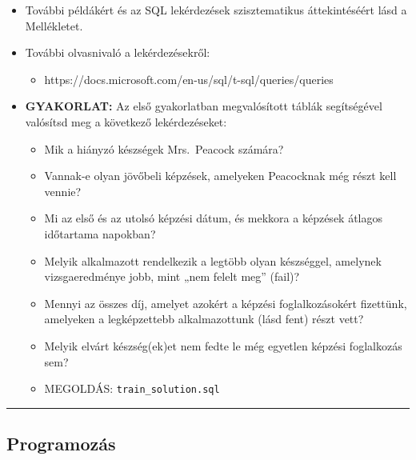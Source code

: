 \documentclass[
  magyar,
]{article}
\providecommand{\tightlist}{%
  \setlength{\itemsep}{0pt}\setlength{\parskip}{0pt}}
\begin{document}
\begin{itemize}
\item
  További példákért és az SQL lekérdezések szisztematikus áttekintéséért
  lásd a Mellékletet.
\item
  További olvasnivaló a lekérdezésekről:

  \begin{itemize}
  \tightlist
  \item
    https://docs.microsoft.com/en-us/sql/t-sql/queries/queries
  \end{itemize}
\item
  \textbf{GYAKORLAT:} Az első gyakorlatban megvalósított táblák
  segítségével valósítsd meg a következő lekérdezéseket:

  \begin{itemize}
  \tightlist
  \item
    Mik a hiányzó készségek Mrs.~Peacock számára?
  \item
    Vannak-e olyan jövőbeli képzések, amelyeken Peacocknak még részt
    kell vennie?
  \item
    Mi az első és az utolsó képzési dátum, és mekkora a képzések átlagos
    időtartama napokban?
  \item
    Melyik alkalmazott rendelkezik a legtöbb olyan készséggel, amelynek
    vizsgaeredménye jobb, mint „nem felelt meg'' (fail)?
  \item
    Mennyi az összes díj, amelyet azokért a képzési foglalkozásokért
    fizettünk, amelyeken a legképzettebb alkalmazottunk (lásd fent)
    részt vett?
  \item
    Melyik elvárt készség(ek)et nem fedte le még egyetlen képzési
    foglalkozás sem?
  \item
    MEGOLDÁS: \texttt{train\_solution.sql}
  \end{itemize}
\end{itemize}

\begin{center}\rule{0.5\linewidth}{0.5pt}\end{center}

\subsection{Programozás}\label{programozuxe1s}
\end{document}
